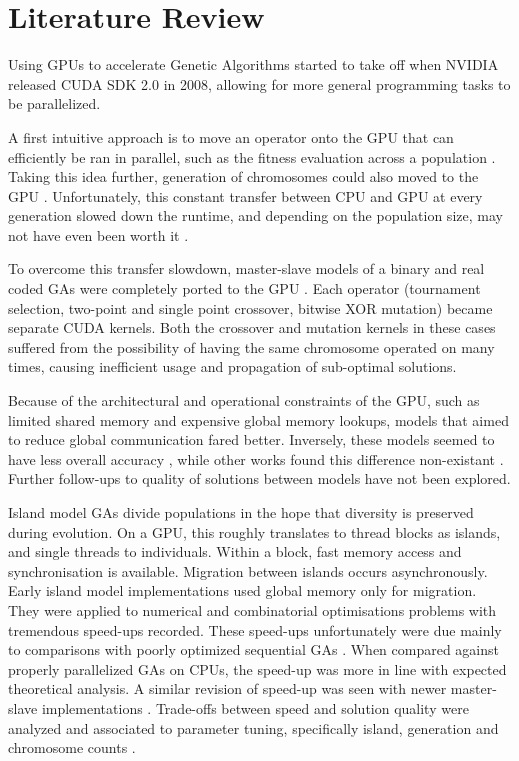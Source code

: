 \documentclass[11pt]{article}       %
\begin{document}
\section{Literature Review} \label{litrev}

Using GPUs to accelerate Genetic Algorithms started to take off when NVIDIA released CUDA SDK 2.0 in 2008, allowing for more general programming tasks to be parallelized.  

A first intuitive approach is to move an operator onto the GPU that can efficiently be ran in parallel, such as the fitness evaluation across a population \cite{Maitre2009-wd}. Taking this idea further, generation of chromosomes could also moved to the GPU \cite{Cavuoti2013-oy}. Unfortunately, this constant transfer between CPU and GPU at every generation slowed down the runtime, and depending on the population size, may not have even been worth it \cite{robilliard2008population}. 

To overcome this transfer slowdown, master-slave models of a binary and real coded GAs were completely ported to the GPU \cite{Debattisti2009-su, Arora2010-ds}. Each operator (tournament selection, two-point and single point crossover, bitwise XOR mutation) became separate CUDA kernels. Both the crossover and mutation kernels in these cases suffered from the possibility of having the same chromosome operated on many times, causing inefficient usage and propagation of sub-optimal solutions.

Because of the architectural and operational constraints of the GPU, such as limited shared memory and expensive global memory lookups, models that aimed to reduce global communication fared better. Inversely, these models seemed to have less overall accuracy \cite{Zheng2011-zr}, while other works found this difference non-existant \cite{jahne2016overview}. Further follow-ups to quality of solutions between models have not been explored.

Island model GAs divide populations in the hope that diversity is preserved during evolution. On a GPU, this roughly translates to thread blocks as islands, and single threads to individuals. Within a block, fast memory access and synchronisation is available. Migration between islands occurs asynchronously.
Early island model implementations \cite{Pospichal2010-lf, Van_Luong2010-mw} used global memory only for migration. They were applied to numerical and combinatorial optimisations problems with tremendous speed-ups recorded. These speed-ups unfortunately were due mainly to comparisons with poorly optimized sequential GAs \cite{Jaros2012-ni}. When compared against properly parallelized GAs on CPUs, the speed-up was more in line with expected theoretical analysis. A similar revision of speed-up was seen with newer master-slave implementations \cite{Sinha2015-dk}. Trade-offs between speed and solution quality were analyzed and associated to parameter tuning, specifically island, generation and chromosome counts \cite{Sun2019-fj}.
\end{document}
